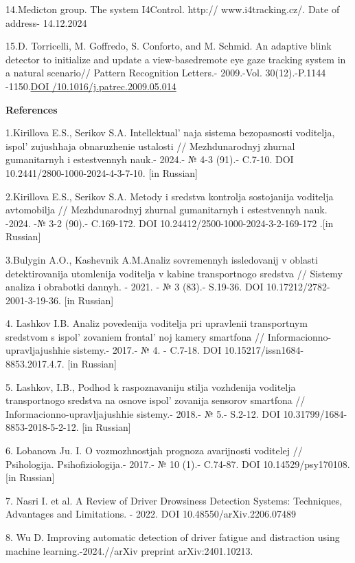 14.Medicton group. The system I4Control. http:// www.i4tracking.cz/.
Date of address- 14.12.2024

15.D. Torricelli, M. Goffredo, S. Conforto, and M. Schmid. An adaptive
blink detector to initialize and update a view-basedremote eye gaze
tracking system in a natural scenario// Pattern Recognition Letters.-
2009.-Vol. 30(12).-P.1144
-1150.\href{https://doi.org/10.1016/j.patrec.2009.05.014}{DOI
/10.1016/j.patrec.2009.05.014}

{\bfseries References}

1.Kirillova E.S., Serikov S.A. Intellektual' naja sistema
bezopasnosti voditelja, ispol' zujushhaja obnaruzhenie
ustalosti // Mezhdunarodnyj zhurnal gumanitarnyh i estestvennyh nauk.-
2024.- № 4-3 (91).- C.7-10. DOI 10.2441/2800-1000-2024-4-3-7-10. {[}in
Russian{]}

2.Kirillova E.S., Serikov S.A. Metody i sredstva kontrolja sostojanija
voditelja avtomobilja // Mezhdunarodnyj zhurnal gumanitarnyh i
estestvennyh nauk. -2024. -№ 3-2 (90).- C.169-172. DOI
10.24412/2500-1000-2024-3-2-169-172 .{[}in Russian{]}

3.Bulygin A.O., Kashevnik A.M.Analiz sovremennyh issledovanij v oblasti
detektirovanija utomlenija voditelja v kabine transportnogo sredstva //
Sistemy analiza i obrabotki dannyh. - 2021. - № 3 (83).- S.19-36. DOI
10.17212/2782-2001-3-19-36. {[}in Russian{]}

4. Lashkov I.B. Analiz povedenija voditelja pri upravlenii transportnym
sredstvom s ispol' zovaniem frontal' noj
kamery smartfona // Informacionno-upravljajushhie sistemy.- 2017.- № 4.
- C.7-18. DOI 10.15217/issn1684-8853.2017.4.7. {[}in Russian{]}

5. Lashkov, I.B., Podhod k raspoznavaniju stilja vozhdenija voditelja
transportnogo sredstva na osnove ispol' zovanija sensorov
smartfona // Informacionno-upravljajushhie sistemy.- 2018.- № 5.-
S.2-12. DOI 10.31799/1684-8853-2018-5-2-12. {[}in Russian{]}

6. Lobanova Ju. I. O vozmozhnostjah prognoza avarijnosti voditelej //
Psihologija. Psihofiziologija.- 2017.- № 10 (1).- C.74-87. DOI
10.14529/psy170108. {[}in Russian{]}

7. Nasri I. et al. A Review of Driver Drowsiness Detection Systems:
Techniques, Advantages and Limitations. - 2022. DOI
10.48550/arXiv.2206.07489

8. Wu D. Improving automatic detection of driver fatigue and distraction
using machine learning.-2024.//arXiv preprint arXiv:2401.10213.

